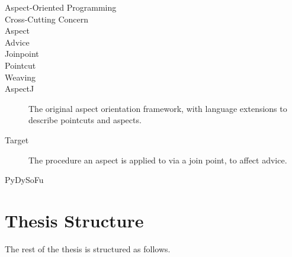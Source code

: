 


\begin{description}
  \item[Aspect-Oriented Programming]
  \item[Cross-Cutting Concern]
    \item[Aspect] 
    \item[Advice] 
    \item[Joinpoint]
    \item[Pointcut] 
    \item[Weaving] 
    \item[AspectJ] The original aspect orientation framework, with language
    extensions to describe pointcuts and aspects.
    \item[Target] The procedure an aspect is applied to via a join point, to
    affect advice.
    \item[PyDySoFu] 
    \item[]
\end{description}


\section{Thesis Structure}

The rest of the thesis is structured as follows. 
